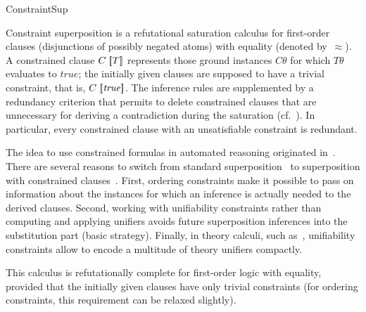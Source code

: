 \begin{entry}{ConstraintSup}
\begin{calculus}
% 
\end{calculus}



\begin{clarifications}
Constraint superposition is a refutational saturation calculus for
first-order clauses (disjunctions of possibly negated atoms)
with equality (denoted by~$\approx$).
A constrained clause $C\mathrel{[\kern-0.18em[T]\kern-0.18em]}$ represents those ground instances $C\theta$
for which $T\theta$ evaluates to $\mathit{true}$;
the initially given clauses are supposed to have a trivial
constraint, that is, $C\mathrel{[\kern-0.18em[\mathit{true}]\kern-0.18em]}$.
The inference rules are supplemented by a redundancy criterion
that permits to delete constrained clauses that are unnecessary for
deriving a contradiction during the saturation (cf.~).
In particular, every constrained clause with an unsatisfiable
constraint is redundant.
\end{clarifications}

\begin{history}
The idea to use constrained formulas in automated reasoning
originated in~\cite{KirchnerKirchnerRusinowitch1990RFIA}.
There are several reasons to switch from
standard superposition~ to
superposition with constrained clauses~\cite{NieuwenhuisRubio1992ESOP,NieuwenhuisRubio1992CADE,NieuwenhuisRubio1995JSC}.
First,
ordering constraints
make it possible to pass on information about the instances
for which an inference is actually needed to the derived clauses.
Second,
working with unifiability constraints
rather than computing and applying unifiers
avoids future superposition inferences
into the substitution part
(basic strategy).
Finally, in theory calculi, such as~\cite{NieuwenhuisRubio1994CADE},
unifiability constraints allow
to encode a multitude of theory
unifiers compactly.

\end{history}

\begin{technicalities}
This calculus is refutationally complete for
first-order logic with equality,
provided that the initially given clauses have only trivial constraints
(for ordering constraints, this requirement can be relaxed slightly).
\end{technicalities}













\end{entry}
